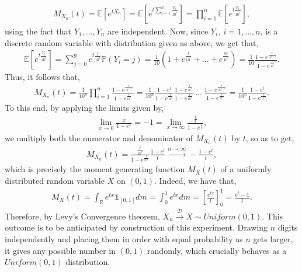 \documentclass{article}
\begin{document}
\begin{eqnarray}
\nonumber
M_{X_n}(t) = \mathbb{E}[e^{tX_n}] = \mathbb{E}[e^{t\sum_{i=1}^{n}\frac{Y_i}{10^i}}] = \prod_{i=1}^{n}\mathbb{E}[e^{t\frac{Y_i}{10^i}}],
\end{eqnarray}
using the fact that $Y_1,...,Y_n$ are independent. Now, since $Y_i, \ i=1,...,n$, is a discrete random variable with distribution given as above, we get that,
\begin{eqnarray}
\nonumber
\mathbb{E}[e^{t\frac{Y_i}{10^i}}] = \sum_{j=0}^{9}e^{t\frac{j}{10^i}}\mathbb{P}(Y_i = j) = \frac{1}{10}(1 + e^{\frac{t}{10^i}} + ... + e^{\frac{9t}{10^i}}) = \frac{1}{10}\frac{1-e^{\frac{t}{10^{i-1}}}}{1-e^{\frac{t}{10^{i}}}}.
\end{eqnarray}
Thus, it follows that,
\begin{eqnarray}
\nonumber
M_{X_n}(t) = \frac{1}{10^n}\prod_{i=1}^{n}\frac{1-e^{\frac{t}{10^{i-1}}}}{1-e^{\frac{t}{10^{i}}}} = \frac{1}{10^n}\frac{1-e^t}{1-e^{\frac{t}{10^2}}}\frac{1-e^{\frac{t}{10^2}}}{1-e^{\frac{t}{10^3}}} \ ... \ \frac{1-e^{\frac{t}{10^{n-1}}}}{1-e^{\frac{t}{10^n}}} = \frac{1}{10^n}\frac{1-e^t}{1-e^{\frac{t}{10^n}}}.
\end{eqnarray}
To this end, by applying the limits given by,
\begin{eqnarray}
\nonumber
\lim_{x \to 0}\frac{x}{1-e^x} = -1 = \lim_{x\to\infty}\frac{\frac{1}{x}}{1-e^{\frac{1}{x}}},
\end{eqnarray}
we multiply both the numerator and denominator of $M_{X_n}(t)$ by $t$, so as to get,
\begin{eqnarray}
\nonumber
M_{X_n}(t) = \frac{\frac{t}{10^n}}{1-e^{\frac{t}{10^n}}}\frac{1-e^t}{t} \xrightarrow{n\to\infty} -\frac{1-e^t}{t},
\end{eqnarray}
which is precisely the moment generating function $M_X(t)$ of a uniformly distributed random variable $X$ on $(0,1)$. Indeed, we have that,
\begin{eqnarray}
\nonumber
M_X(t) = \int_{\mathbb{R}}e^{tx}\mathds{1}_{[0,1]}dm = \int_0^{1}e^{tx}dm = \left[\frac{e^{tx}}{t}\right]_{0}^{1} = \frac{e^t - 1}{t}.
\end{eqnarray}
Therefore, by Levy's Convergence theorem, $X_n \xrightarrow{\mathcal{D}} X \sim Uniform(0,1)$. This outcome is to be anticipated by construction of this experiment. Drawing $n$ digits independently and placing them in order with equal probability as $n$ gets larger, it gives any possible number in $(0,1)$ randomly, which crucially behaves as a $Uniform(0,1)$ distribution.
\end{document}

